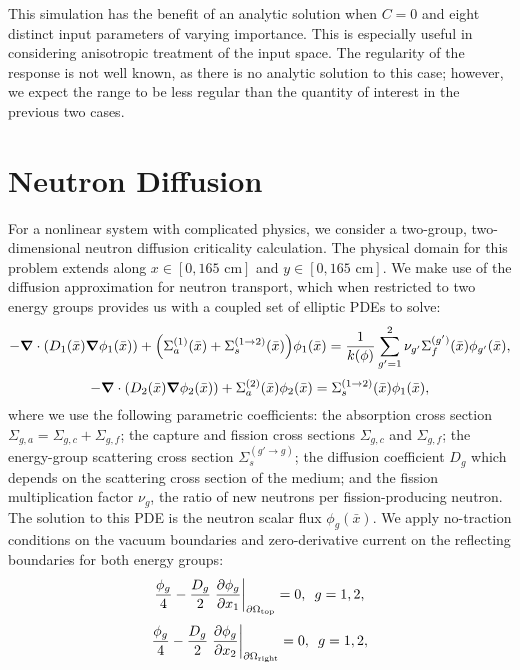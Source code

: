This simulation has the benefit of an analytic solution when $C=0$ and eight distinct input parameters of
varying importance.  This is especially useful in considering anisotropic treatment of the input space.  The
regularity of the response is not well known, as there is no analytic solution to this case; however, we
expect the range to be less regular than the quantity of interest in the previous two cases.




\section{Neutron Diffusion}
For a nonlinear system with complicated physics, we consider a two-group, two-dimensional neutron diffusion
criticality calculation.  The physical domain for this problem extends along $x\in[0,165\text{ cm}]$ and
$y\in[0,165\text{ cm}]$.
We make use of the diffusion approximation for neutron transport, which when restricted to two energy groups provides us
with a coupled set of elliptic PDEs to solve:
\begin{equation}
-\grad\cdot\qty( D_1(\bar x)\grad\phi_1(\bar x))+\qty(\Sigma_{a}^{(1)}(\bar x)+\Sigma_{s}^{(1\to2)}(\bar x))\phi_1(\bar x) = \frac{1}{k(\phi)}\sum_{g'=1}^2\nu_{g'}\Sigma_{f}^{(g')}(\bar x)\phi_{g'}(\bar x),
\end{equation}
\begin{equation}
-\grad \cdot\qty(D_2(\bar x)\grad \phi_2(\bar x))+\Sigma_{a}^{(2)}(\bar x)\phi_2(\bar x) = \Sigma_{s}^{(1\to 2)}(\bar x)\phi_1(\bar x),
\end{equation}
where we use the following parametric coefficients: 
the absorption cross section $\Sigma_{g,a}=\Sigma_{g,c}+\Sigma_{g,f}$; 
the capture and fission cross sections $\Sigma_{g,c}$ and $\Sigma_{g,f}$; 
the energy-group scattering cross section $\Sigma_s^{(g'\to g)}$; 
the diffusion coefficient $D_g$ which depends on the scattering cross section of the medium;
and the fission multiplication factor $\nu_g$, the ratio of new neutrons per fission-producing neutron.  The
solution to this PDE is the neutron scalar flux $\phi_g(\bar x)$.  We apply no-traction conditions on the
vacuum boundaries and zero-derivative current on the reflecting boundaries for both energy groups:
\begin{equation}
\frac{\phi_g}{4}-\frac{D_g}{2}\eval{\pdv{\phi_g}{x_1}}_{\partial \Omega_\text{top}}=0,\hspace{5pt} g=1,2,
\end{equation}
\begin{equation}
\frac{\phi_g}{4}-\frac{D_g}{2}\eval{\pdv{\phi_g}{x_2}}_{\partial \Omega_\text{right}}=0,\hspace{5pt} g=1,2,
\end{equation}
